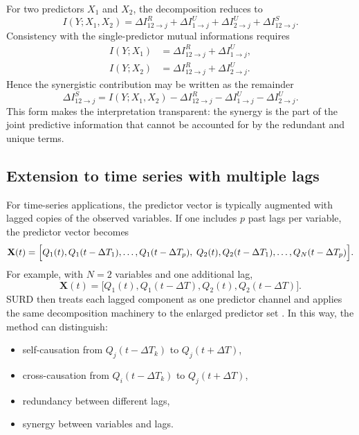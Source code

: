 \documentclass[12pt, a4paper]{article}
\begin{document}
For two predictors \(X_1\) and \(X_2\), the decomposition reduces to
\begin{equation}
I(Y;X_1,X_2)
=
\Delta I_{12\to j}^{R}
+
\Delta I_{1\to j}^{U}
+
\Delta I_{2\to j}^{U}
+
\Delta I_{12\to j}^{S}.
\label{eq:two_source_total}
\end{equation}
Consistency with the single-predictor mutual informations requires
\begin{align}
I(Y;X_1) &= \Delta I_{12\to j}^{R} + \Delta I_{1\to j}^{U},\\
I(Y;X_2) &= \Delta I_{12\to j}^{R} + \Delta I_{2\to j}^{U}.
\end{align}
Hence the synergistic contribution may be written as the remainder
\begin{equation}
\Delta I_{12\to j}^{S}
=
I(Y;X_1,X_2)
-
\Delta I_{12\to j}^{R}
-
\Delta I_{1\to j}^{U}
-
\Delta I_{2\to j}^{U}.
\end{equation}
This form makes the interpretation transparent: the synergy is the part of the joint predictive information that cannot be accounted for by the redundant and unique terms.

\subsection{Extension to time series with multiple lags}

For time-series applications, the predictor vector is typically augmented with lagged copies of the observed variables. If one includes \(p\) past lags per variable, the predictor vector becomes
\begin{equation}
\mathbf{X}(t)=
\Bigl[
Q_1(t),Q_1(t-\Delta T_1),\ldots,Q_1(t-\Delta T_p),\;
Q_2(t),Q_2(t-\Delta T_1),\ldots,Q_N(t-\Delta T_p)
\Bigr].
\label{eq:lagged_vector_general}
\end{equation}
For example, with \(N=2\) variables and one additional lag,
\begin{equation}
\mathbf{X}(t)=
\bigl[
Q_1(t),Q_1(t-\Delta T),Q_2(t),Q_2(t-\Delta T)
\bigr].
\label{eq:lagged_vector_two}
\end{equation}
SURD then treats each lagged component as one predictor channel and applies the same decomposition machinery to the enlarged predictor set \cite{MartinezSanchez2024SURD}. In this way, the method can distinguish:
\begin{itemize}
    \item self-causation from \(Q_j(t-\Delta T_k)\) to \(Q_j(t+\Delta T)\),
    \item cross-causation from \(Q_i(t-\Delta T_k)\) to \(Q_j(t+\Delta T)\),
    \item redundancy between different lags,
    \item synergy between variables and lags.
\end{itemize}
\end{document}
